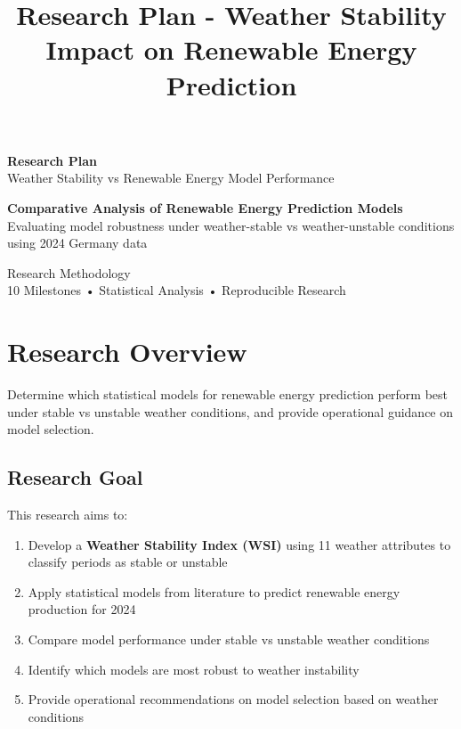 \documentclass[11pt,a4paper]{article}
\title{\textbf{\color{primaryblue}Research Plan - Weather Stability Impact on Renewable Energy Prediction}}
\author{}
\date{}
\begin{document}
\begin{titlepage}
\centering
\vspace*{2cm}

{\Huge\bfseries\color{primaryblue}Research Plan}\\[0.5cm]
{\Large\color{secondaryblue}Weather Stability vs Renewable Energy Model Performance}\\[2cm]

\begin{tcolorbox}[colback=lightgray,colframe=primaryblue,boxrule=2pt,arc=5pt,width=0.8\textwidth]
\centering
\large\textbf{Comparative Analysis of Renewable Energy Prediction Models}\\[0.3cm]
\small Evaluating model robustness under weather-stable vs weather-unstable conditions using 2024 Germany data
\end{tcolorbox}

\vspace{2cm}

\vfill
{\large\color{darkgray}Research Methodology}\\[0.2cm]
{\small\color{darkgray}10 Milestones • Statistical Analysis • Reproducible Research}
\end{titlepage}

\newpage
\tableofcontents
\newpage

\section{Research Overview}

\begin{objectivebox}
Determine which statistical models for renewable energy prediction perform best under stable vs unstable weather conditions, and provide operational guidance on model selection.
\end{objectivebox}

\subsection{Research Goal}

This research aims to:
\begin{enumerate}
    \item Develop a \textbf{Weather Stability Index (WSI)} using 11 weather attributes to classify periods as stable or unstable
    \item Apply statistical models from literature to predict renewable energy production for 2024
    \item Compare model performance under stable vs unstable weather conditions
    \item Identify which models are most robust to weather instability
    \item Provide operational recommendations on model selection based on weather conditions
\end{enumerate}
\end{document}
